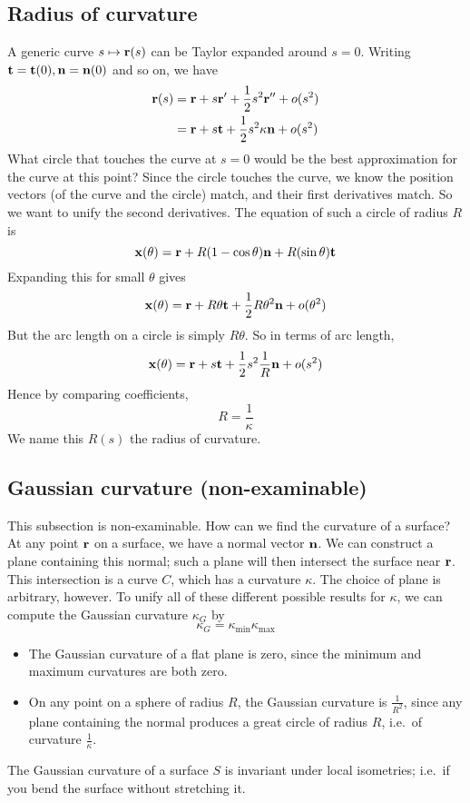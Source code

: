 \subsection{Radius of curvature}
A generic curve \(s \mapsto \vb r(s)\) can be Taylor expanded around \(s=0\).
Writing \(\vb t = \vb t(0), \vb n = \vb n(0)\) and so on, we have
\begin{align*}
	\vb r(s) & = \vb r + s\vb r' + \frac{1}{2}s^2 \vb r'' + o(s^2)    \\
	         & = \vb r + s\vb t + \frac{1}{2}s^2 \kappa\vb n + o(s^2)
\end{align*}
What circle that touches the curve at \(s=0\) would be the best approximation for the curve at this point?
Since the circle touches the curve, we know the position vectors (of the curve and the circle) match, and their first derivatives match.
So we want to unify the second derivatives.
The equation of such a circle of radius \(R\) is
\[
	\vb x(\theta) = \vb r + R(1 - \cos \theta)\vb n + R(\sin \theta) \vb t
\]
Expanding this for small \(\theta\) gives
\[
	\vb x(\theta) = \vb r + R\theta\vb t + \frac{1}{2} R\theta^2\vb n + o(\theta^2)
\]
But the arc length on a circle is simply \(R\theta\).
So in terms of arc length,
\[
	\vb x(\theta) = \vb r + s\vb t + \frac{1}{2} s^2 \frac{1}{R}\vb n + o(s^2)
\]
Hence by comparing coefficients,
\[
	R = \frac{1}{\kappa}
\]
We name this \(R(s)\) the radius of curvature.

\subsection{Gaussian curvature (non-examinable)}
This subsection is non-examinable.
How can we find the curvature of a surface?
At any point \(\vb r\) on a surface, we have a normal vector \(\vb n\).
We can construct a plane containing this normal; such a plane will then intersect the surface near \(\vb r\).
This intersection is a curve \(C\), which has a curvature \(\kappa\).
The choice of plane is arbitrary, however.
To unify all of these different possible results for \(\kappa\), we can compute the Gaussian curvature \(\kappa_G\) by
\[
	\kappa_G = \kappa_{\text{min}} \kappa_{\text{max}}
\]
\begin{itemize}
	\item The Gaussian curvature of a flat plane is zero, since the minimum and maximum curvatures are both zero.
	\item On any point on a sphere of radius \(R\), the Gaussian curvature is \(\frac{1}{R^2}\), since any plane containing the normal produces a great circle of radius \(R\), i.e.\ of curvature \(\frac{1}{\kappa}\).
\end{itemize}

\begin{theorem}
	The Gaussian curvature of a surface \(S\) is invariant under local isometries; i.e.\ if you bend the surface without stretching it.
\end{theorem}
